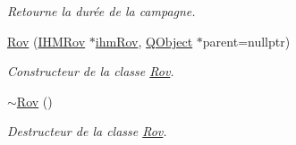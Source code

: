 \begin{DoxyCompactItemize}
\begin{DoxyCompactList}\small\item\em Retourne la durée de la campagne. \end{DoxyCompactList}\item 
\hyperlink{class_rov_a6e893548f3aadca5660540feb74f06f4}{Rov} (\hyperlink{class_i_h_m_rov}{I\+H\+M\+Rov} $\ast$\hyperlink{class_rov_a9b1c1c3b4e268a32e69b2ea4c863b817}{ihm\+Rov}, \hyperlink{class_q_object}{Q\+Object} $\ast$parent=nullptr)
\begin{DoxyCompactList}\small\item\em Constructeur de la classe \hyperlink{class_rov}{Rov}. \end{DoxyCompactList}\item 
\hyperlink{class_rov_a6e41f712195b9af74fd75b781745d1b5}{$\sim$\+Rov} ()
\begin{DoxyCompactList}\small\item\em Destructeur de la classe \hyperlink{class_rov}{Rov}. \end{DoxyCompactList}\end{DoxyCompactItemize}
